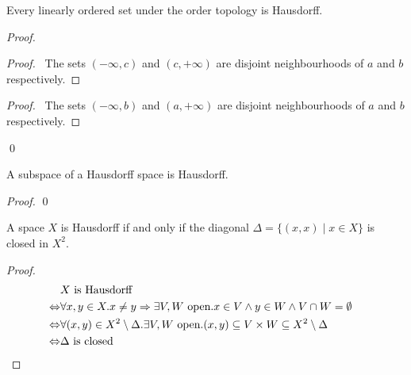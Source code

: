 \begin{theorem}
    Every linearly ordered set under the order topology is Hausdorff.
\end{theorem}

\begin{proof}
    \pf
    \begin{proof}
        \pf\ The sets $(-\infty,c)$ and $(c,+\infty)$ are disjoint neighbourhoods of $a$ and $b$
        respectively.
    \end{proof}
    \begin{proof}
        \pf\ The sets $(-\infty, b)$ and $(a,+\infty)$ are disjoint neighbourhoods of $a$ and $b$
        respectively.
    \end{proof}
    \qed
\end{proof}

\begin{theorem}
    A subspace of a Hausdorff space is Hausdorff.
\end{theorem}

\begin{proof}
    \pf
    \qed
\end{proof}

\begin{proposition}
    A space $X$ is Hausdorff if and only if the diagonal $\Delta = \{ (x,x) \mid x \in X \}$ is closed in $X^2$.
\end{proposition}

\begin{proof}
    \pf
    \begin{align*}
        & X \text{ is Hausdorff} \\
        \Leftrightarrow & \forall x,y \in X. x \neq y \Rightarrow \exists V, W \text{ open}. x \in V \wedge y \in W \wedge V \cap W = \emptyset \\
        \Leftrightarrow & \forall (x,y) \in X^2 \setminus \Delta. \exists V,W \text{ open}. (x,y) \subseteq V \times W \subseteq X^2 \setminus \Delta \\
        \Leftrightarrow & \Delta \text{ is closed} & \qed
    \end{align*}
\end{proof}

